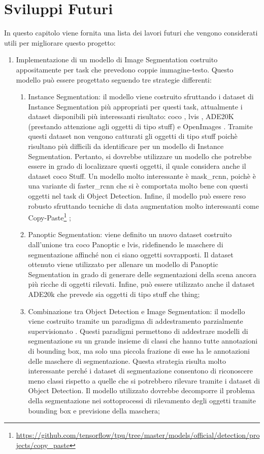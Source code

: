 \chapter{Sviluppi Futuri}
In questo capitolo viene fornita una lista dei lavori futuri che vengono considerati utili per migliorare questo progetto:
\begin{enumerate}
    \item Implementazione di un modello di Image Segmentation costruito appositamente per task che prevedono coppie immagine-testo. Questo modello può essere progettato seguendo tre strategie differenti:
    \begin{enumerate}
        \item Instance Segmentation: il modello viene costruito sfruttando i dataset di Instance Segmentation più appropriati per questi task, attualmente i dataset disponibili più interessanti risultato: \acrshort{coco} \cite{lin2014microsoft}, \acrshort{lvis} \cite{gupta2019lvis}, ADE20K \cite{zhou2017scene} (prestando attenzione agli oggetti di tipo stuff) e OpenImages \cite{OpenImages}. Tramite questi dataset non vengono catturati gli oggetti di tipo stuff poichè risultano più difficili da identificare per un modello di Instance Segmentation. Pertanto, si dovrebbe utilizzare un modello che potrebbe essere in grado di localizzare questi oggetti, il quale considera anche il dataset \acrshort{coco} Stuff. Un modello molto interessante è \acrshort{mask_rcnn}, poichè è una variante di \acrshort{faster_rcnn} che si è comportata molto bene con questi oggetti nel task di Object Detection.
        Infine, il modello può essere reso robusto sfruttando tecniche di data augmentation molto interessanti come Copy-Paste\footnote{\url{https://github.com/tensorflow/tpu/tree/master/models/official/detection/projects/copy_paste}} \cite{ghiasi2020simple};
        \item Panoptic Segmentation: viene definito un nuovo dataset costruito dall'unione tra \acrshort{coco} Panoptic e \acrshort{lvis}, ridefinendo le maschere di segmentazione affinché non ci siano oggetti sovrapposti. Il dataset ottenuto viene utilizzato per allenare un modello di Panoptic Segmentation in grado di generare delle segmentazioni della scena ancora più ricche di oggetti rilevati. Infine, può essere utilizzato anche il dataset ADE20k che prevede sia oggetti di tipo stuff che thing;
        \item Combinazione tra Object Detection e Image Segmentation: il modello viene costruito tramite un paradigma di addestramento parzialmente supervisionato \cite{hu2018learning}. Questi paradigmi permettono di addestrare modelli di segmentazione su un grande insieme di classi che hanno tutte annotazioni di bounding box, ma solo una piccola frazione di esse ha le annotazioni delle maschere di segmentazione. Questa strategia risulta molto interessante perché i dataset di segmentazione consentono di riconoscere meno classi rispetto a quelle che si potrebbero rilevare tramite i dataset di Object Detection. Il modello utilizzato dovrebbe  decomporre il problema della segmentazione nei sottoprocessi di rilevamento degli oggetti tramite bounding box e previsione della maschera;

\end{enumerate}
\end{enumerate}
